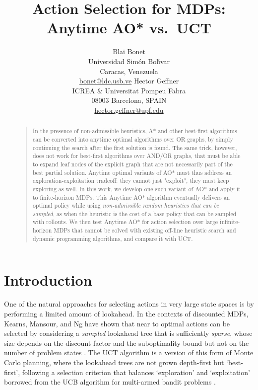 \documentclass[letterpaper]{article}
\begin{document}
\title{Action Selection for MDPs: Anytime AO* vs.\ UCT}

\author{Blai Bonet \\
        Universidad Sim\'on Bol\'{\i}var \\
        Caracas, Venezuela \\
        {\normalsize\url{bonet@ldc.usb.ve}}
\And
        Hector Geffner \\
        ICREA \&  Universitat Pompeu Fabra \\
        08003  Barcelona, SPAIN \\
        {\normalsize\url{hector.geffner@upf.edu}}}


\maketitle
\begin{abstract}
\begin{quote}
In the presence of non-admissible heuristics, A* and other best-first algorithms
can be  converted into anytime optimal algorithms over OR graphs, by simply continuing
the search after the first solution is found. The same trick, however, does not work
for  best-first algorithms over AND/OR graphs, that must be able to expand leaf nodes of
the explicit graph that are not necessarily part of the best partial solution.
Anytime optimal variants of AO* must thus address an exploration-exploitation tradeoff:
they cannot just "exploit", they must keep exploring as well. In this work,
we develop one such variant of AO* and apply it to finite-horizon MDPs.
This Anytime AO* algorithm eventually delivers an optimal policy  while using
\emph{non-admissible random heuristics that can be sampled}, as when the heuristic
is the cost of a base policy that can be sampled with rollouts.
We then test Anytime AO* for action selection
over large infinite-horizon MDPs that cannot be solved with existing off-line
heuristic search and dynamic programming algorithms, and compare it with UCT.
\end{quote}
\end{abstract}

\section{Introduction}

One of the natural approaches for selecting  actions in  very large state spaces
is by performing a limited amount of lookahead. In the contexts of discounted
MDPs, Kearns, Mansour, and Ng have shown  that near to optimal actions can be selected by considering a
\emph{sampled}  lookahead tree that is sufficiently \emph{sparse},   whose size depends on the discount factor
and the suboptimality bound  but not on  the number of problem states \cite{kearns:sparse99}.
The UCT algorithm \cite{uct} is a version of this form of Monte Carlo planning, where the lookahead trees are not grown
depth-first but `best-first',  following a selection criterion that balances `exploration' and `exploitation'
borrowed from the UCB algorithm  for  multi-armed bandit problems \cite{ucb}.
\end{document}
